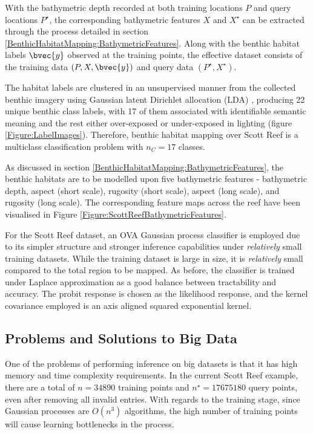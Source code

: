 		With the bathymetric depth recorded at both training locations $P$ and query locations $P^{\star}$, the corresponding bathymetric features $X$ and $X^{\star}$ can be extracted through the process detailed in section \ref{BenthicHabitatMapping:BathymetricFeatures}. Along with the benthic habitat labels $\bvec{y}$ observed at the training points, the effective dataset consists of the training data $(P, X, \bvec{y})$ and query data $(P^{\star}, X^{\star})$.

		The habitat labels are clustered in an unsupervised manner from the collected benthic imagery using Gaussian latent Dirichlet allocation (LDA) \citep{Steinberg2015128}, producing 22 unique benthic class labels, with 17 of them associated with identifiable semantic meaning and the rest either over-exposed or under-exposed in lighting (figure \ref{Figure:LabelImages}). Therefore, benthic habitat mapping over Scott Reef is a multiclass classification problem with $n_{C} = 17$ classes.
		
		As discussed in section \ref{BenthicHabitatMapping:BathymetricFeatures}, the benthic habitats are to be modelled upon five bathymetric features - bathymetric depth, aspect (short scale), rugosity (short scale), aspect (long scale), and rugosity (long scale). The corresponding feature maps across the reef have been visualised in Figure \ref{Figure:ScottReefBathymetricFeatures}.
			
		For the Scott Reef dataset, an OVA Gaussian process classifier is employed due to its simpler structure and stronger inference capabilities under \textit{relatively} small training datasets. While the training dataset is large in size, it is \textit{relatively} small compared to the total region to be mapped. As before, the classifier is trained under Laplace approximation as a good balance between tractability and accuracy. The probit response is chosen as the likelihood response, and the kernel covariance employed is an axis aligned squared exponential kernel.
			
		\subsection{Problems and Solutions to Big Data}
		\label{BenthicHabitatMapping:ScottReef:BigData}
		
			One of the problems of performing inference on big datasets is that it has high memory and time complexity requirements. In the current Scott Reef example, there are a total of $n = 34890$ training points and $n^{\star} = 17675180$ query points, even after removing all invalid entries. With regards to the training stage, since Gaussian processes are $O(n^{3})$ algorithms, the high number of training points will cause learning bottlenecks in the process.
			
